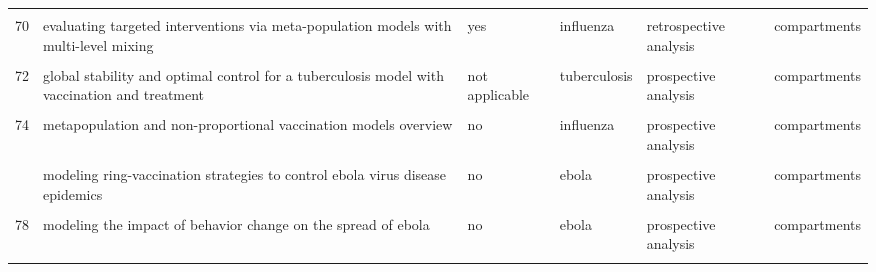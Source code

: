 \documentclass[
]{article}
\begin{document}
\begin{landscape}
\begin{longtable}{l>{\raggedright\arraybackslash}p{3.3cm}l>{\raggedright\arraybackslash}p{3.3cm}>{\raggedright\arraybackslash}p{2cm}l}
\cellcolor{gray!6}{69} & \cellcolor{gray!6}{epidemiological evaluation of different fmd control strategies in two selected regions in austria} & \cellcolor{gray!6}{yes} & \cellcolor{gray!6}{fmd} & \cellcolor{gray!6}{retrospective analysis} & \cellcolor{gray!6}{agents}\\
70 & evaluating targeted interventions via meta-population models with multi-level mixing & yes & influenza & retrospective analysis & compartments\\
\addlinespace
\cellcolor{gray!6}{71} & \cellcolor{gray!6}{evaluation of outbreak response immunization in the control of pertussis using agent-based modeling} & \cellcolor{gray!6}{yes} & \cellcolor{gray!6}{pertussis} & \cellcolor{gray!6}{prospective analysis} & \cellcolor{gray!6}{agents}\\
72 & global stability and optimal control for a tuberculosis model with vaccination and treatment & not applicable & tuberculosis & prospective analysis & compartments\\
\cellcolor{gray!6}{73} & \cellcolor{gray!6}{impact on epidemic measles of vaccination campaigns triggered by disease outbreaks or serosurveys: a modeling study} & \cellcolor{gray!6}{no} & \cellcolor{gray!6}{measles} & \cellcolor{gray!6}{prospective analysis} & \cellcolor{gray!6}{compartments}\\
74 & metapopulation and non-proportional vaccination models overview & no & influenza & prospective analysis & compartments\\
\cellcolor{gray!6}{75} & \cellcolor{gray!6}{model-based comprehensive analysis of school closure policies for mitigating influenza epidemics and pandemics} & \cellcolor{gray!6}{yes} & \cellcolor{gray!6}{influenza} & \cellcolor{gray!6}{prospective analysis} & \cellcolor{gray!6}{agents}\\
\addlinespace
76 & modeling ring-vaccination strategies to control ebola virus disease epidemics & no & ebola & prospective analysis & compartments\\
\cellcolor{gray!6}{77} & \cellcolor{gray!6}{modeling the effect of public health resources and alerting on the dynamics of pertussis spread*} & \cellcolor{gray!6}{yes} & \cellcolor{gray!6}{pertussis} & \cellcolor{gray!6}{prospective analysis} & \cellcolor{gray!6}{compartments}\\
78 & modeling the impact of behavior change on the spread of ebola & no & ebola & prospective analysis & compartments\\
\cellcolor{gray!6}{79} & \cellcolor{gray!6}{modeling the spread of polio in an ipv-vaccinated population: lessons learned from the 2013 silent outbreak in southern israel} & \cellcolor{gray!6}{yes} & \cellcolor{gray!6}{poliomyelitis} & \cellcolor{gray!6}{retrospective analysis} & \cellcolor{gray!6}{compartments}\\

\end{longtable}
\end{landscape}
\end{document}
